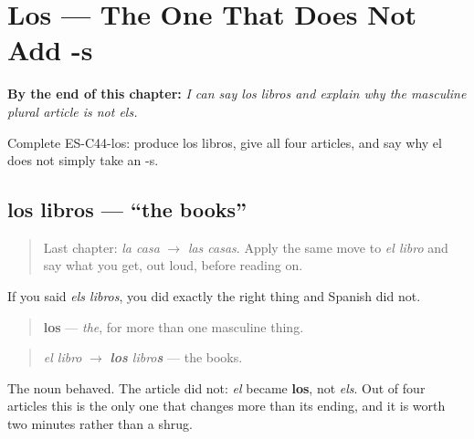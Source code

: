
\chapter{Los --- The One That Does Not Add -s}
\label{ch:articles-los}

\begin{chapteropening}
\textbf{By the end of this chapter:} \emph{I can say los libros and explain why the masculine plural article is not els.}

Complete ES-C44-los: produce los libros, give all four articles, and say why el does not simply take an -s.
\end{chapteropening}

\section[los libros]{los libros — \textquotedblleft{}the books\textquotedblright{}}

\label{lesson:ES-C44-los}



\begin{quote}
Last chapter: \emph{la casa} $\to$ \emph{las casas}. Apply the same move to \emph{el libro} and say what you get, out loud, before reading on.
\end{quote}

\begin{grammarlens}[title={Grammar Lens: not els}]
If you said \emph{els libros}, you did exactly the right thing and Spanish did not.

\begin{quote}
\textbf{los} — \emph{the}, for more than one masculine thing.
\end{quote}

\begin{quote}
\emph{el libro} $\to$ \emph{\textbf{los} libro\textbf{s}} — the books.
\end{quote}

The noun behaved. The article did not: \emph{el} became \textbf{los}, not \emph{els}. Out of four articles this is the only one that changes more than its ending, and it is worth two minutes rather than a shrug.
\end{grammarlens}

